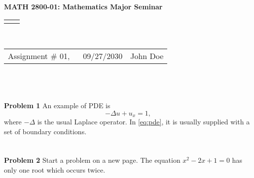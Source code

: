 \documentclass[11pt]{article}
\renewcommand{\theequation}{\thesection.\arabic{equation}}
\renewcommand{\title}[1]{\textbf{#1}\\}
\renewcommand{\line}{\begin{tabularx}{\textwidth}{X>{\raggedleft}X}\hline\\\end{tabularx}\\[-0.5cm]}
\newcommand{\leftright}[2]{\begin{tabularx}{\textwidth}{X>{\raggedleft}X}#1%
& #2\\\end{tabularx}\\[-0.5cm]}
\begin{document}
\title{MATH 2800-01: Mathematics Major Seminar}
\line
\leftright{Assignment \# 01, ~~ 09/27/2030}{John Doe}

\vspace*{-2cm}
\renewcommand{\theequation}{1.\arabic{equation}}
\setcounter{equation}{0}
\section*{}{\bf Problem 1}
An example of PDE is
%
\begin{equation} \label{eq:pde}
	-\Delta u + u_x = 1,
\end{equation}
%
where $-\Delta$ is the usual Laplace operator. In \eqref{eq:pde}, it is usually supplied with a set of boundary conditions.

\newpage
\renewcommand{\theequation}{2.\arabic{equation}}
\section*{} {\bf Problem 2}
Start a problem on a new page. The equation $x^2-2x+1=0$ has only one root which occurs twice.
\end{document}
